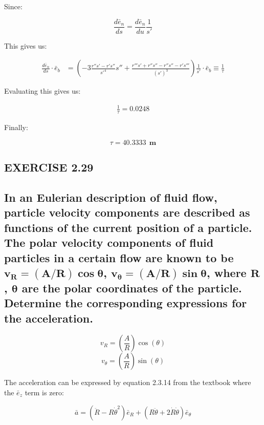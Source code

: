 \documentclass[12pt, letterpaper]{../assignment}
\begin{document}
Since:

$$ \frac{d \bar{e}_n}{d s} = \frac{d \bar{e}_n}{d u} \frac{1}{s'} $$

This gives us:

\begin{equation*}
    \begin{aligned}
    \frac{d \bar{e}_n}{d s} \cdot \bar{e}_b
    &= \left(-3\frac{r'' s' - r's''}{{s'}^4}{s''}
    + \frac{r''' s' + r''s'' - r''s'' - r's'''}{(s')^3}\right)\frac{1}{s'} \cdot \bar{e}_b \equiv \frac{1}{\tau}
    \end{aligned}
\end{equation*}

Evaluating this gives us:

\begin{equation*}
    \begin{aligned}
    \frac{1}{\tau} = 0.0248
    \end{aligned}
\end{equation*}

Finally:

\begin{answer}
$$ \tau = 40.3333 \ \ \textbf{m} $$
\end{answer}

\subsection*{EXERCISE 2.29}
\subsection*{In an Eulerian description of fluid flow,
particle velocity components are described as functions of the current position of a particle.
The polar velocity components of fluid particles in a certain flow are known to be $\bm{v_R = (A/R)\cos\theta}$,
$\bm{v_\theta = (A/R)\sin\theta}$, where $\bm{R}$, $\bm{\theta}    $ are the polar coordinates of the particle.
Determine the corresponding expressions for the acceleration.}

$$ v_R      = \left(\frac{A}{R}\right)\cos(\theta) $$
$$ v_\theta = \left(\frac{A}{R}\right)\sin(\theta) $$

The acceleration can be expressed by equation 2.3.14 from the textbook where the $\bar{e}_z$ term is zero:

$$ \bar{a} = \left( \ddot{R} - R \dot{\theta}^2 \right) \bar{e}_R +
\left( R \ddot{\theta} + 2 \dot{R} \dot{\theta} \right) \bar{e}_\theta $$
\end{document}
